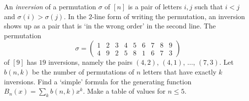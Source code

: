 \begin{exercise}
    An \emph{inversion} of a permutation $\sigma$ of $[n]$ is a pair of letters $i,j$ such that $i< j$ and $\sigma(i) > \sigma(j)$. In the $2$-line form of writing the permutation, an inversion shows up as a pair that is `in the wrong order' in the second line. The permutation
    \[
        \sigma = \begin{pmatrix}
            1 & 2 & 3 & 4 & 5 & 6 & 7 & 8 & 9 \\
            4 & 9 & 2 & 5 & 8 & 1 & 6 & 7 & 3
        \end{pmatrix}
    \]
    of $[9]$ has $19$ inversions, namely the pairs $(4, 2)$, $(4, 1)$, $\ldots$, $(7,3)$. Let $b(n,k)$ be the number of permutations of $n$ letters that have exactly $k$ inversions. Find a `simple' formula for the generating function $B_n(x) = \sum_k b(n,k)x^k$.
    Make a table of values for $n\leq 5$.
\end{exercise}
